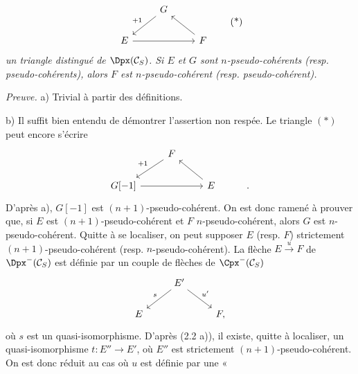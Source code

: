 \[
\begin{tikzcd}
& G \arrow[dl,"+1"'] & \\
E \arrow[rr] && F \arrow[ul]
\end{tikzcd}
\tag{*}
\]
\emph{un
triangle distingué de \(\Dpx(\mathcal C_S)\). Si \(E\) et \(G\) sont \(n\)-pseudo-cohérents (resp. pseudo-cohérents), alors \(F\) est \(n\)-pseudo-cohérent (resp. pseudo-cohérent).}

\emph{Preuve.} a) Trivial à partir des définitions.

b) Il suffit bien entendu de démontrer l'assertion non respée. Le triangle \((*)\) peut encore s'écrire
\[
\begin{tikzcd}
& F \arrow[dl,"+1"'] & \\
G[-1] \arrow[rr] && E \arrow[ul] & .
\end{tikzcd}
\]
D'après a), \(G[-1]\) est \((n+1)\)-pseudo-cohérent. On est donc ramené à prouver que, si \(E\) est \((n+1)\)-pseudo-cohérent et \(F\) \(n\)-pseudo-cohérent, alors \(G\) est \(n\)-pseudo-cohérent. Quitte à se localiser, on peut supposer \(E\) (resp. \(F\)) strictement \((n+1)\)-pseudo-cohérent (resp. \(n\)-pseudo-cohérent). La flèche \(E\xrightarrow{u}F\) de \(\Dpx^-(\mathcal C_S)\) est définie par un couple de flèches de \(\Cpx^-(\mathcal C_S)\)
\[
\begin{tikzcd}
& E' \arrow[dl,"s"'] \arrow[dr,"u'"]\\
E && F ,
\end{tikzcd}
\]
où \(s\) est un quasi-isomorphisme. D'après (2.2 a)), il existe, quitte à localiser, un quasi-isomorphisme \(t:E''\to E'\), où \(E''\) est strictement \((n+1)\)-pseudo-cohérent. On est donc réduit au cas où \(u\) est définie par une «
